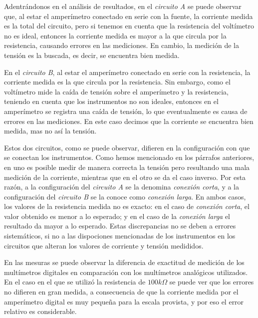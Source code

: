 \documentclass{article}
\begin{document}
	Adentrándonos en el análisis de resultados, en el \textit{circuito A} se puede observar que, al estar el amperímetro conectado en serie con la fuente, la corriente medida es la total del circuito, pero si tenemos en cuenta que la resistencia del voltímetro no es ideal, entonces la corriente medida es mayor a la que circula por la resistencia, causando errores en las mediciones. En cambio, la medición de la tensión es la buscada, es decir, se encuentra bien medida.
	\par
	En el \textit{circuito B}, al estar el amperímetro conectado en serie con la resistencia, la corriente medida es la que circula por la resistencia. Sin embargo, como el voltímetro mide la caída de tensión sobre el amperímetro y la resistencia, teniendo en cuenta que los instrumentos no son ideales, entonces en el amperímetro se registra una caída de tensión, lo que eventualmente es causa de errores en las mediciones. En este caso decimos que la corriente se encuentra bien medida, mas no así la tensión.
	\par
	Estos dos circuitos, como se puede observar, difieren en la configuración con que se conectan los instrumentos. Como hemos mencionado en los párrafos anteriores, en uno es posible medir de manera correcta la tensión pero resultando una mala medición de la corriente, mientras que en el otro se da el caso inverso. Por esta razón, a la configuración del \textit{circuito A} se la denomina \textit{conexión corta}, y a la configuración del \textit{circuito B} se la conoce como \textit{conexión larga}. En ambos casos, los valores de la resistencia medida no es exacto: en el caso de \textit{conexión corta}, el valor obtenido es menor a lo esperado; y en el caso de la \textit{conexión larga} el resultado da mayor a lo esperado. Estas discrepancias no se deben a errores sistemáticos, si no a las dispociones mencionadas de los instrumentos en los circuitos que alteran los valores de corriente y tensión medididos.
	\par
	En las mesuras se puede observar la diferencia de exactitud de medición de los multímetros digitales en comparación con los multímetros analógicos utilizados. En el caso en el que se utilizó la resistencia de $100k\Omega$ se puede ver que los errores no difieren en gran medida, a consecuencia de que la corriente medida por el amperímetro digital es muy pequeña para la escala provista, y por eso el error relativo es considerable.
	\par
\end{document}
